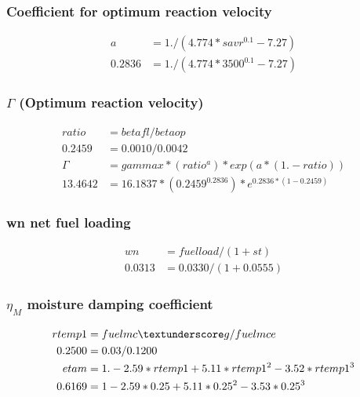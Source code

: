 \documentclass{article}
\begin{document}
\subsubsection*{}

\subsubsection*{Coefficient for optimum reaction velocity}

\begin{equation}
	\begin{split}
		a &= 1./(4.774 * savr^{0.1} - 7.27) \\
		0.2836 &= 1./(4.774 * 3500^{0.1} - 7.27)
	\end{split}
\end{equation}
\subsubsection*{$\Gamma$ (Optimum reaction velocity)}
\begin{equation}
	\begin{split}
		ratio &= betafl / betaop \\
		0.2459 &= 0.0010 / 0.0042 \\
		\Gamma &= gammax*(ratio^a)*exp(a*(1.-ratio)) \\
		13.4642 &= 16.1837 * (0.2459 ^ 0.2836) * e^{0.2836 * (1- 0.2459)}
	\end{split}
\end{equation}

\subsubsection*{wn net fuel loading}

\begin{equation}
\label{wn_WRF}
	\begin{split}
	wn &= fuelload / (1+ st) \\
	0.0313 &= 0.0330 / (1 + 0.0555)	
	\end{split}
\end{equation}

\subsubsection*{$\eta_M$ moisture damping coefficient}
\begin{equation}
	\begin{split}
		rtemp1 &= fuelmc\textunderscore g / fuelmce \\
		0.2500 &= 0.03 / 0.1200 \\
		etam & = 1.-2.59*rtemp1 +5.11*rtemp1^2 -3.52*rtemp1^3 \\
		0.6169 &= 1 - 2.59 * 0.25 + 5.11 * 0.25^2 - 3.53 * 0.25^3
	\end{split}
\end{equation}
\end{document}
